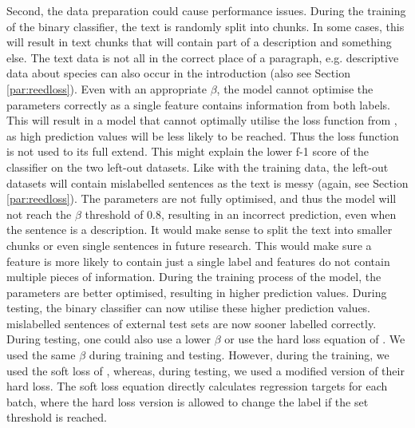 \documentclass[a4paper, 12pt, oneside]{book} %
\begin{document}
Second, the data preparation could cause performance issues.
During the training of the binary classifier, the text is randomly split into chunks. 
In some cases, this will result in text chunks that will contain part of a description and something else.
The text data is not all in the correct place of a paragraph, e.g. descriptive data about species can also occur in the introduction (also see Section \ref{par:reedloss}).
Even with an appropriate \(\beta\), the model cannot optimise the parameters correctly as a single feature contains information from both labels.
This will result in a model that cannot optimally utilise the loss function from \textcite{reed_training_2015}, as high prediction values will be less likely to be reached.
Thus the loss function is not used to its full extend.
This might explain the lower f-1 score of the classifier on the two left-out datasets.
Like with the training data, the left-out datasets will contain mislabelled sentences as the text is messy (again, see Section \ref{par:reedloss}).
The parameters are not fully optimised, and thus the model will not reach the \(\beta\) threshold of 0.8, resulting in an incorrect prediction, even when the sentence is a description.
It would make sense to split the text into smaller chunks or even single sentences in future research.
This would make sure a feature is more likely to contain just a single label and features do not contain multiple pieces of information.
During the training process of the model, the parameters are better optimised, resulting in higher prediction values.
During testing, the binary classifier can now utilise these higher prediction values.
mislabelled sentences of external test sets are now sooner labelled correctly.
During testing, one could also use a lower \(\beta\) or use the hard loss equation of \textcite{reed_training_2015}.
We used the same \(\beta\) during training and testing.
However, during the training, we used the soft loss of \textcite{reed_training_2015}, whereas, during testing, we used a modified version of their hard loss.
The soft loss equation directly calculates regression targets for each batch, where the hard loss version is allowed to change the label if the set threshold is reached.
\end{document}

